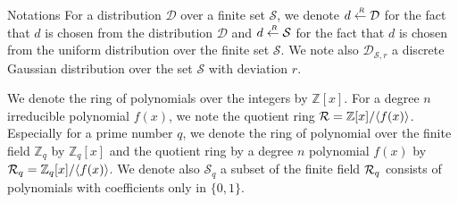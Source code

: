 \begin{subsection}{Notations}
  For a distribution $\mathcal{D}$ over a finite set $\mathcal{S}$,
  we denote $d \stackrel{{\scriptscriptstyle \mkern4mu R}}{\gets} \mathcal{D}$ for the fact that $d$ is chosen from the distribution $\mathcal{D}$ and
  $d \stackrel{{\scriptscriptstyle \mkern4mu R}}{\gets} \mathcal{S}$ for the fact that $d$ is chosen from the uniform distribution over the finite set $\mathcal{S}$.
  We note also $\mathcal{D}_{\mathcal{S}, r}$ a discrete Gaussian distribution over the set $\mathcal{S}$ with deviation $r$.

  We denote the ring of polynomials over the integers by $\mathbb{Z}[x]$.
  For a degree $n$ irreducible polynomial $f(x)$, we note the quotient ring ${\mathcal{R}} = \mathbb{Z}[x]/\langle f(x) \rangle$.
  Especially for a prime number $q$, we denote the ring of polynomial over the finite field $\mathbb{Z}_q$ by $\mathbb{Z}_q[x]$
  and the quotient ring by a degree $n$ polynomial $f(x)$ by ${\mathcal{R}}_q = \mathbb{Z}_q[x]/\langle f(x) \rangle$.
  We denote also $\mathcal{S}_q$ a subset of the finite field ${\mathcal{R}}_q$ consists of polynomials with coefficients only in $ \{0,1\}$.

  

\end{subsection}

